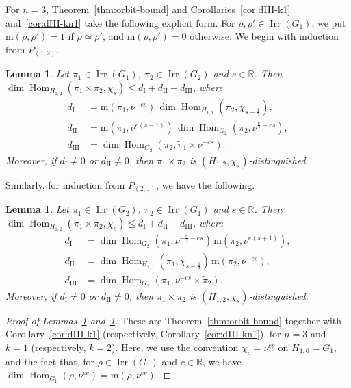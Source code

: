 \documentclass[11pt]{amsart}
\numberwithin{equation}{section}
\theoremstyle{plain}
\newtheorem{lemma}[theorem]{Lemma}
\theoremstyle{definition}
\theoremstyle{remark}
\newcommand{\R}{\mathbb{R}}
\DeclareMathOperator{\Hom}{Hom}
\DeclareMathOperator{\Irr}{Irr}
\newcommand{\dI}{d_{\mathrm{I}}}
\newcommand{\dII}{d_{\mathrm{II}}}
\newcommand{\dIII}{d_{\mathrm{III}}}
\begin{document}
For $n=3$, Theorem~\ref{thm:orbit-bound} and Corollaries~\ref{cor:dIII-k1} and~\ref{cor:dIII-kn1} take the following explicit form. For $\rho,\rho'\in\Irr(G_1)$, we put $\mathrm m(\rho,\rho')=1$ if $\rho\simeq\rho'$, and $\mathrm m(\rho,\rho')=0$ otherwise. We begin with induction from $P_{(1,2)}$.

\begin{lemma}\label{lem:n3-bound-k1}
	Let $\pi_1\in\Irr(G_1)$, $\pi_2\in\Irr(G_2)$ and $s\in\R$. Then $\dim\Hom_{H_{1,2}}(\pi_1\times\pi_2,\chi_s)\le\dI+\dII+\dIII$, where
	\begin{align*}
		\dI&=\mathrm m(\pi_1,\nu^{-es})\,\dim\Hom_{H_{1,1}}(\pi_2,\chi_{s+\frac12}),\\
		\dII&=\mathrm m(\pi_1,\nu^{e(s-1)})\,\dim\Hom_{G_2}(\pi_2,\nu^{\frac e2-es}),\\
		\dIII&=\dim\Hom_{G_2}(\pi_2,\widetilde\pi_1\times\nu^{-es}).
	\end{align*}
	Moreover, if $\dI\ne0$ or $\dII\ne0$, then $\pi_1\times\pi_2$ is $(H_{1,2},\chi_s)$-distinguished.
\end{lemma}

Similarly, for induction from $P_{(2,1)}$, we have the following.

\begin{lemma}\label{lem:n3-bound-k2}
	Let $\pi_1\in\Irr(G_2)$, $\pi_2\in\Irr(G_1)$ and $s\in\R$. Then $\dim\Hom_{H_{1,2}}(\pi_1\times\pi_2,\chi_s)\le\dI+\dII+\dIII$, where
	\begin{align*}
		\dI&=\dim\Hom_{G_2}(\pi_1,\nu^{-\frac e2-es})\,\mathrm m(\pi_2,\nu^{e(s+1)}),\\
		\dII&=\dim\Hom_{H_{1,1}}(\pi_1,\chi_{s-\frac12})\,\mathrm m(\pi_2,\nu^{-es}),\\
		\dIII&=\dim\Hom_{G_2}(\pi_1,\nu^{-es}\times\widetilde\pi_2).
	\end{align*}
	Moreover, if $\dI\ne0$ or $\dII\ne0$, then $\pi_1\times\pi_2$ is $(H_{1,2},\chi_s)$-distinguished.
\end{lemma}

\begin{proof}[Proof of Lemmas~\ref{lem:n3-bound-k1} and~\ref{lem:n3-bound-k2}]
	These are Theorem~\ref{thm:orbit-bound} together with Corollary~\ref{cor:dIII-k1} (respectively, Corollary~\ref{cor:dIII-kn1}), for $n=3$ and $k=1$ (respectively, $k=2$). Here, we use the convention $\chi_c=\nu^{ec}$ on $H_{1,0}=G_1$, and the fact that, for $\rho\in\Irr(G_1)$ and $c\in\R$, we have $\dim\Hom_{G_1}(\rho,\nu^{ec})=\mathrm m(\rho,\nu^{ec})$.
\end{proof}
\end{document}
